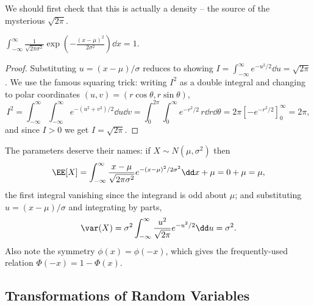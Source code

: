 \begin{center}
\end{center}

We should first check that this is actually a density -- the source of the mysterious $\sqrt{2\pi}$.

\begin{proposition}
	$\displaystyle\int_{-\infty}^{\infty} \frac{1}{\sqrt{2\pi\sigma^2}} \exp\left(-\frac{(x-\mu)^2}{2\sigma^2}\right)\dd x = 1$.
\end{proposition}
\begin{proof}
	Substituting $u = (x - \mu)/\sigma$ reduces to showing $I = \int_{-\infty}^{\infty} e^{-u^2/2}\dd u = \sqrt{2\pi}$. We use the famous squaring trick: writing $I^2$ as a double integral and changing to polar coordinates $(u, v) = (r\cos\theta, r\sin\theta)$,
	$$
	I^2 = \int_{-\infty}^{\infty}\!\int_{-\infty}^{\infty} e^{-(u^2 + v^2)/2}\dd u \dd v = \int_0^{2\pi}\!\!\int_0^{\infty} e^{-r^2/2}\, r\dd r\dd\theta = 2\pi \left[-e^{-r^2/2}\right]_0^{\infty} = 2\pi,
	$$
	and since $I > 0$ we get $I = \sqrt{2\pi}$.
\end{proof}

The parameters deserve their names: if $X \sim N(\mu, \sigma^2)$ then
$$
\EE[X] = \int_{-\infty}^{\infty} \frac{x - \mu}{\sqrt{2\pi\sigma^2}}e^{-(x - \mu)^2/2\sigma^2}\dd x + \mu = 0 + \mu = \mu,
$$
the first integral vanishing since the integrand is odd about $\mu$; and substituting $u = (x - \mu)/\sigma$ and integrating by parts,
$$
\var(X) = \sigma^2 \int_{-\infty}^{\infty} \frac{u^2}{\sqrt{2\pi}}e^{-u^2/2}\dd u = \sigma^2.
$$
Also note the symmetry $\phi(x) = \phi(-x)$, which gives the frequently-used relation $\Phi(-x) = 1 - \Phi(x)$.

\subsection{Transformations of Random Variables}

